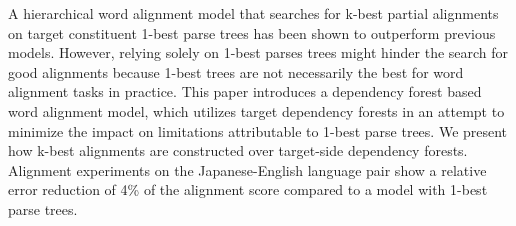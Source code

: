 A hierarchical word alignment model that searches for k-best partial alignments on target constituent 1-best parse trees has been shown to outperform previous models. However, relying solely on 1-best parses trees might hinder the search for good alignments because 1-best trees are not necessarily the best for word alignment tasks in practice. This paper introduces a dependency forest based word alignment model, which utilizes target dependency forests in an attempt to minimize the impact on limitations attributable to 1-best parse trees. We present how k-best alignments are constructed over target-side dependency forests. Alignment experiments on the Japanese-English language pair show a relative error reduction of 4\% of the alignment score compared to a model with 1-best parse trees.

